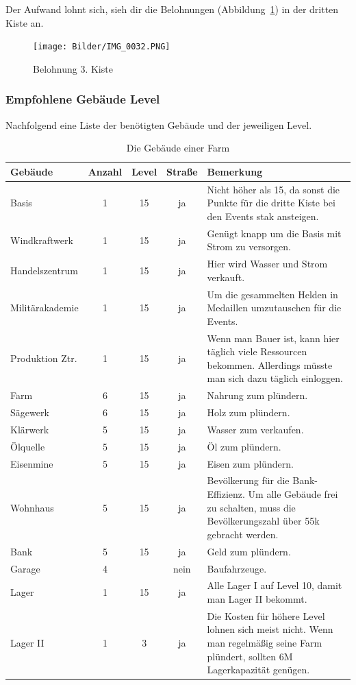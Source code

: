 \documentclass[fontsize=12pt,a4paper]{scrartcl}[2003/01/01]
\begin{document}
Der Aufwand lohnt sich, sieh dir die Belohnungen (Abbildung~\ref{fig:belohnung}) in der dritten Kiste an.

\begin{figure}[H] 
  \centering
     \texttt{[image: Bilder/IMG\_0032.PNG]}
  \caption{Belohnung 3. Kiste}
  \label{fig:belohnung}
\end{figure}



\subsubsection{Empfohlene Gebäude Level}

Nachfolgend eine Liste der benötigten Gebäude und der jeweiligen Level.

\begin{table}[h!]
  \centering
\begin{tabularx}{1.0\textwidth}{lcccX}
  Gebäude & Anzahl & Level & Straße & Bemerkung \\
  \hline
  Basis & 1 & 15 & ja & Nicht höher als 15, da sonst die Punkte für die dritte Kiste bei den Events stak ansteigen. \\
  Windkraftwerk & 1 & 15 & ja & Genügt knapp um die Basis mit Strom zu versorgen. \\
  Handelszentrum & 1 & 15 & ja & Hier wird Wasser und Strom verkauft. \\
  Militärakademie & 1 & 15 & ja & Um die gesammelten Helden in Medaillen umzutauschen für die Events. \\
  Produktion Ztr. & 1 & 15 & ja & Wenn man Bauer ist, kann hier täglich viele Ressourcen bekommen. 
                                  Allerdings müsste man sich dazu täglich einloggen.\\
  Farm & 6 & 15 & ja & Nahrung zum plündern. \\
  Sägewerk & 6 & 15 & ja & Holz zum plündern. \\
  Klärwerk & 5 & 15 & ja & Wasser zum verkaufen. \\
  Ölquelle & 5 & 15 & ja & Öl zum plündern. \\
  Eisenmine & 5 & 15 & ja & Eisen zum plündern. \\
  Wohnhaus & 5 & 15 & ja & Bevölkerung für die Bank-Effizienz.
                           Um alle Gebäude frei zu schalten, muss die Bevölkerungszahl über 55k gebracht werden. \\
  Bank & 5 & 15 & ja & Geld zum plündern. \\
  Garage & 4 & ~ & nein & Baufahrzeuge. \\
  Lager & 1 & 15 & ja & Alle Lager I auf Level 10, damit man Lager II bekommt. \\
  Lager II & 1 & 3 & ja & Die Kosten für höhere Level lohnen sich meist nicht. 
                          Wenn man regelmäßig seine Farm plündert, sollten 6M Lagerkapazität genügen. \\
\end{tabularx}
\caption[Gebäude]{Die Gebäude einer Farm}
\end{table}
\end{document}
